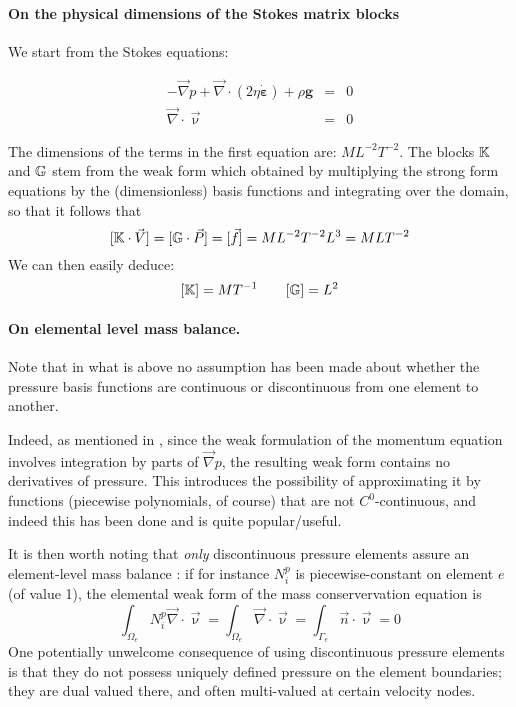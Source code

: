 \paragraph{On the physical dimensions of the Stokes matrix blocks}

We start from the Stokes equations:

\begin{eqnarray}
- {\vec \nabla p} + {\vec \nabla} \cdot (2 \eta \dot{\bm \varepsilon} ) + \rho {\bm g} &=& 0  \\
\vec \nabla \cdot \vec \upnu &=& 0 
\end{eqnarray}

The dimensions of the terms in the first equation are: $ML^{-2}T^{-2}$. The blocks ${\mathbb{K}}$ and ${\mathbb{G}}$
stem from the weak form which obtained by multiplying the strong form equations by the (dimensionless)
basis functions and integrating over the domain, so that it follows that 
\[
[ {\mathbb{K}} \cdot \vec V] = [{\mathbb{G}} \cdot \vec P] = [\vec f] = ML^{-2}T^{-2} L^3 = MLT^{-2} 
\]
We can then easily deduce:
\[
[{\mathbb{K}}]=MT^{-1}
\quad
\quad
[{\mathbb{G}}]=L^2
\]

\paragraph{On elemental level mass balance.}

Note that in what is above no assumption has been made about whether 
the pressure basis functions are continuous or discontinuous from one 
element to another. 

Indeed, as mentioned in \cite{grsa}, since the 
weak formulation of the momentum equation involves
integration by parts of ${\vec \nabla }p$, the resulting weak form contains 
no derivatives of pressure. This introduces the possibility of approximating it
by functions (piecewise polynomials, of course) that are not $C^0$-continuous, 
and indeed this has been done and is quite popular/useful. 

It is then worth noting that {\sl only} discontinuous pressure 
elements assure an element-level mass balance \cite{grsa}:
if for instance $N_i^p$ is piecewise-constant on element $e$ (of value 1), the 
elemental weak form of the mass conservervation equation is 
\[
\int_{\Omega_e} N_i^p {\vec \nabla} \cdot {\vec \upnu} = 
\int_{\Omega_e} {\vec \nabla} \cdot {\vec \upnu} = 
\int_{\Gamma_e} {\vec n} \cdot {\vec \upnu} = 0
\]
One potentially unwelcome consequence of using 
discontinuous pressure elements is that they 
do not possess uniquely defined pressure 
on the element boundaries; they are dual valued there, 
and often multi-valued at certain velocity nodes. 

